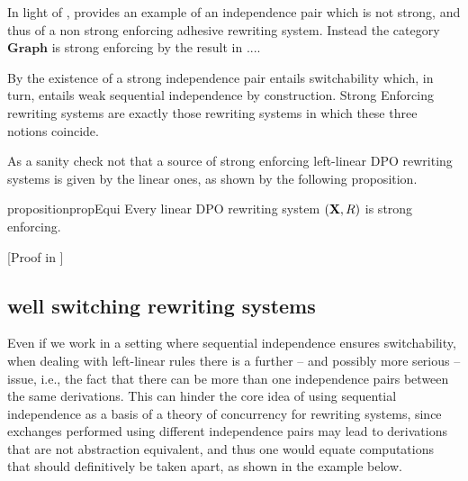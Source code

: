 \documentclass[a4paper,UKenglish,cleveref,pdftex, thm-restate,numberwithinsect,anonymous]{lipics}
\newcommand{\cat}[1]{\ensuremath{\mathbf{#1}}}
\def\R{\mathsf{R}}
\def\X{\textbf {\textup{X}}}
\newcommand{\rem}[2]{{\color{blue}#1}{\color{red}#2}}
\renewcommand{\rem}[2]{}
\begin{document}
\begin{example}
  \label{ex:diff2}
  In light of ,  provides an example
  of an independence pair which is not strong, and thus of a non strong enforcing
  adhesive rewriting system. Instead the category $\cat{Graph}$ is
  strong enforcing by the result in ....
\end{example}

\begin{remark}
  By  the existence of a strong independence pair
  entails switchability which, in turn, entails weak sequential
  independence by construction. Strong Enforcing rewriting systems are exactly
  those rewriting systems in which these three notions coincide.
\end{remark}




As a sanity check not that a source of strong enforcing left-linear DPO rewriting systems is given by the linear ones, as shown by the following proposition.

\begin{restatable}{proposition}{propEqui}
  \label{prop:equi}
  Every linear DPO rewriting system $(\X, \R)$ is strong enforcing.
\end{restatable}
[Proof in ]

\subsection{well switching rewriting systems}\label{subsec:verytame}

Even if we work in a setting where sequential independence ensures switchability, when dealing with left-linear rules there is a further -- and possibly more serious -- issue, i.e., the fact that there can be more than one independence pairs between the same derivations. This can hinder the core idea of using sequential independence as a basis of a theory of concurrency for rewriting systems, since exchanges performed using different independence pairs may lead to derivations that are not abstraction equivalent, and thus one would equate computations that 
should definitively be taken apart, as shown in the example below.
\end{document}
